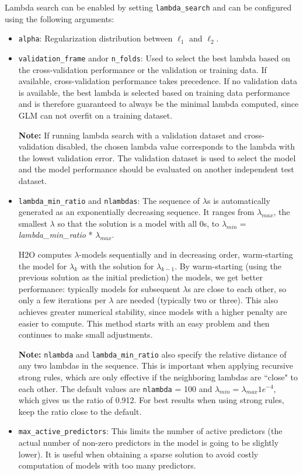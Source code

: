 Lambda search can be enabled by setting \texttt{lambda\_search} and can be configured using the following arguments:

\begin{itemize}
\item \texttt{alpha}: Regularization distribution between  $\ell_1$ and  $\ell_2$.
\item \texttt{validation\_frame} and\/or \texttt{n\_folds}: Used to select the best lambda based on the cross-validation performance  or the validation or training data. If available, cross-validation performance takes precedence. If no validation data is available, the best lambda is selected based on training data performance and is therefore guaranteed to always be the minimal lambda computed, since GLM can not overfit on a training dataset.
 
\textbf{Note:} If running lambda search with a validation dataset and cross-validation disabled, the chosen lambda value corresponds to the lambda with the lowest validation error. The validation dataset is used to select the model and the model performance should be evaluated on another independent test dataset. 

\item \texttt{lambda\_min\_ratio} and \texttt{nlambdas}: The sequence of $\lambda$s is automatically generated as an exponentially decreasing sequence. It ranges from $\lambda_{max}$,
the smallest $\lambda$ so that the solution is a model with all 0s, to $\lambda_{min} =
$ \textit{lambda\_min\_ratio} * $ \lambda_{max}$.

H2O computes $\lambda$-models sequentially and in decreasing order, warm-starting the model for $\lambda_k$ with the solution for $\lambda_{k-1}$. By warm-starting (using the previous solution as the initial prediction) the models, we get better performance: typically models for subsequent $\lambda$s are close to each other, so only a few iterations per $\lambda$ are needed (typically two or three). This also achieves greater numerical stability, since models with a higher penalty are easier to compute. This method starts with an easy problem and then continues to make small adjustments. 

\textbf{Note:} \texttt{nlambda} and \texttt{lambda\_min\_ratio} also specify the relative distance of any two
 lambdas in the sequence. This is important when applying recursive strong rules, which are only effective if the neighboring lambdas are ``close" to each other. The default values are \texttt{nlambda} = 100 and $\lambda_{min}
= \lambda_{max} 1e^{-4}$, which gives us the ratio of 0.912.  For best results when using strong rules, keep the
ratio close to the default.

\item \texttt{max\_active\_predictors}: This limits the number of active predictors (the actual number of non-zero predictors in the model is going to be slightly lower). It is useful when obtaining a sparse solution to avoid costly computation of models with too many predictors.

\end{itemize}

